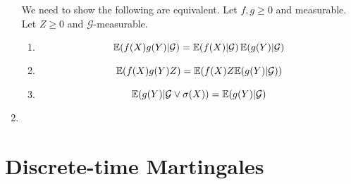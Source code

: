 \begin{enumerate}
  We need to show the following are equivalent.  Let $f, g \geq 0$ and
  measurable.  Let $Z \geq 0$ and $\mathcal{G}$-measurable.  
  \begin{enumerate}
  \item \label{item:1}
    \begin{equation}
      \label{eq:17}
      \E{f(X) g(Y) | \mathcal{G}} = \E{f(X) | \mathcal{G}} \E{g(Y) | \mathcal{G}}
    \end{equation}
  \item \label{item:2}
    \begin{equation}
      \label{eq:18}
      \E{f(X) g(Y) Z} = \E{f(X) Z \E{g(Y) | \mathcal{G}}} 
    \end{equation}
  \item \label{item:3}
    \begin{equation}
      \label{eq:19}
      \E{g(Y) | \mathcal{G} \vee \sigma(X)} = \E{g(Y) | \mathcal{G}}
    \end{equation}
  \end{enumerate}

\item 
\end{enumerate}

\section{Discrete-time Martingales}
\label{sec:discr-time-mart}

